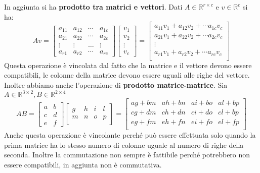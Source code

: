 In aggiunta si ha \textbf{prodotto tra matrici e vettori}. Dati $A\in \mathbb{R}^{r\times c}$
e $v\in \mathbb{R}^{c}$ si ha:
\begin{equation*}
    Av = \left[\begin{array}{cccc}
            a_{11} & a_{12} & \cdots & a_{1c} \\
            a_{21} & a_{22} & \cdots & a_{2c} \\
            \vdots & \vdots & \dots  & \vdots \\
            a_{r1} & a_{r2} & \cdots & a_{rc}
        \end{array}\right] \left[\begin{array}{c}
            v_1 \\v_2\\\vdots\\v_c
        \end{array}\right] = \left[\begin{array}{c}
            a_{11}v_1+a_{12}v_2+\cdots a_{1c}v_c \\
            a_{21}v_1+a_{22}v_2+\cdots a_{2c}v_c \\
            \vdots                               \\
            a_{r1}v_1+a_{r2}v_2+\cdots a_{rc}v_c \\
        \end{array}\right]
\end{equation*}
Questa operazione è vincolata dal fatto che la matrice e il vettore devono
essere compatibili, le colonne della matrice devono essere uguali alle righe del
vettore. Inoltre abbiamo anche l'operazione di \textbf{prodotto matrice-matrice}.
Sia $A\in \mathbb{R}^{3\times 2}, B\in \mathbb{R}^{2\times 4}$
\begin{equation*}
    AB = \left[\begin{array}{cc}
            a & b \\
            c & d \\
            e & f
        \end{array}\right]\left[\begin{array}{cccc}
            g & h & i & l \\
            m & n & o & p \\
        \end{array}\right] = \left[\begin{array}{cccc}
            ag+bm & ah+bn & ai+bo & al+bp \\
            cg+dm & ch+dn & ci+do & cl+bp \\
            eg+fm & eh+fn & ei+fo & el+fp \\
        \end{array}\right]
\end{equation*}
Anche questa operazione è vincolante perché può essere effettuata solo quando la
prima matrice ha lo stesso numero di colonne uguale al numero di righe della
seconda. Inoltre la commutazione non sempre è fattibile perché potrebbero non
essere compatibili, in aggiunta non è commutativa.